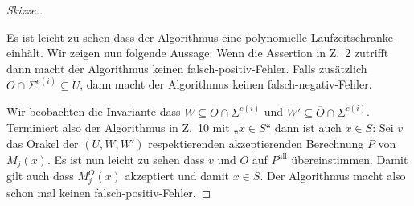 \documentclass[nofonts]{uebung}
\begin{document}
\begin{proof}[Skizze.]
    \noindent%
    \begin{algorithm}[H]
    \end{algorithm}
    Es ist leicht zu sehen dass der Algorithmus eine polynomielle Laufzeitschranke einhält.
    Wir zeigen nun folgende Aussage: Wenn die Assertion in Z.~2 zutrifft dann macht der Algorithmus keinen falsch-positiv-Fehler. Falls zusätzlich $O\cap \Sigma^{e(i)}\subseteq U$, dann macht der Algorithmus keinen falsch-negativ-Fehler.

    Wir beobachten die Invariante dass $W\subseteq O\cap\Sigma^{e(i)}$ und $W'\subseteq \overline{O}\cap\Sigma^{e(i)}$. 
    Terminiert also der Algorithmus in Z.~10 mit „$x\in S$“ dann ist auch $x\in S$: Sei $v$ das Orakel der $(U, W, W')$ respektierenden akzeptierenden Berechnung $P$ von $M_j(x)$. Es ist nun leicht zu sehen dass $v$ und $O$ auf $P^\mathrm{all}$ übereinstimmen. Damit gilt auch dass $M_j^O(x)$ akzeptiert und damit $x\in S$.
    Der Algorithmus macht also schon mal keinen falsch-positiv-Fehler.


\end{proof}
\end{document}
